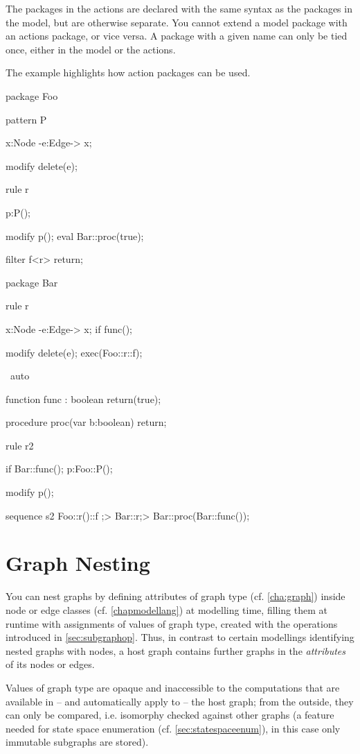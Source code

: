 The packages in the actions are declared with the same syntax as the packages in the model, but are otherwise separate. 
You cannot extend a model package with an actions package, or vice versa.
A package with a given name can only be tied once, either in the model or the actions.

\begin{example}
The example highlights how action packages can be used.
	\begin{grgen}
package Foo {
	pattern P {
		x:Node -e:Edge-> x;

		modify {
			delete(e);
		}
	}
	
	rule r {
		p:P();

		modify {
			p();
			eval { Bar::proc(true); }
		}
	}
	
	filter f<r> {
		return;
	}
}

package Bar {
	rule r {
		x:Node -e:Edge-> x;
		if{ func(); }

		modify {
			delete(e);
			exec(Foo::r\Foo::f);
		}
	} \ auto
		
	function func : boolean {
		return(true);
	}
	
	procedure proc(var b:boolean) {
		return;
	}	
}

rule r2 {
	if{ Bar::func(); }
	p:Foo::P();
	
	modify {
		p();
	}
}

sequence s2 {
	Foo::r()\Foo::f ;> Bar::r\auto ;> { Bar::proc(Bar::func()); }
}
	\end{grgen}
\end{example}

\section{Graph Nesting}\label{sec:graphnesting}

You can nest graphs by defining attributes of graph type (cf. \ref{cha:graph}) inside node or edge classes (cf. \ref{chapmodellang}) at modelling time, 
filling them at runtime with assignments of values of graph type, created with the operations introduced in \ref{sec:subgraphop}.
Thus, in contrast to certain modellings identifying nested graphs with nodes, a host graph contains further graphs in the \emph{attributes} of its nodes or edges.

Values of graph type are opaque and inaccessible to the computations that are available in -- and automatically apply to -- the host graph; 
from the outside, they can only be compared, i.e. isomorphy checked against other graphs
(a feature needed for state space enumeration (cf. \ref{sec:statespaceenum}), in this case only immutable subgraphs are stored).

